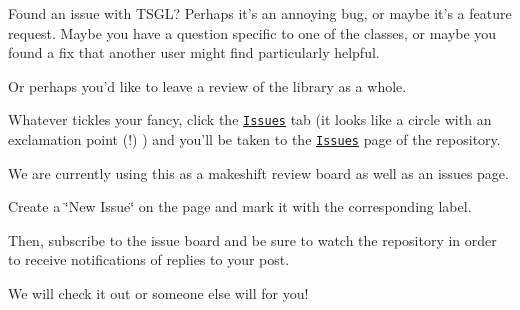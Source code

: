 Found an issue with T\-S\-G\-L? Perhaps it's an annoying bug, or maybe it's a feature request. Maybe you have a question specific to one of the classes, or maybe you found a fix that another user might find particularly helpful.

Or perhaps you'd like to leave a review of the library as a whole.

Whatever tickles your fancy, click the \href{https://github.com/Calvin-CS/TSGL/issues}{\tt Issues} tab (it looks like a circle with an exclamation point (!) ) and you'll be taken to the \href{https://github.com/Calvin-CS/TSGL/issues}{\tt Issues} page of the repository.

We are currently using this as a makeshift review board as well as an issues page.

Create a \char`\"{}\-New Issue\char`\"{} on the page and mark it with the corresponding label.

Then, subscribe to the issue board and be sure to watch the repository in order to receive notifications of replies to your post.

We will check it out or someone else will for you! 